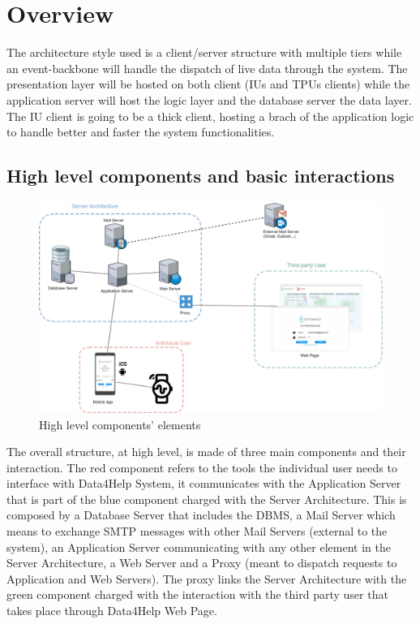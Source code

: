 \section{Overview}
The architecture style used is a client/server structure with multiple tiers while an event-backbone will handle the dispatch of live data through the system. The presentation layer will be hosted on both client (IUs and TPUs clients) while the application server will host the logic layer and the database server the data layer. The IU client is going to be a thick client, hosting a brach of the application logic to handle better and faster the system functionalities.
\subsection{High level components and basic interactions}
\begin{figure}[H]
\caption{High level components' elements}
\includegraphics[width = \textwidth]{sections/architecturalDesign/overview_1.jpg}
\end{figure}

The overall structure, at high level, is made of three main components and their interaction. 
The red component refers to the tools the individual user needs to interface with Data4Help System, it communicates with the Application Server that is part of the blue component charged with the Server Architecture. This is composed by a Database Server that includes the DBMS, a Mail Server which means to exchange SMTP messages with other Mail Servers (external to the system), an Application Server communicating with any other element in the Server Architecture, a Web Server and a Proxy (meant to dispatch requests to Application and Web Servers). 
The proxy links the Server Architecture with the green component charged with the interaction with the third party user that takes place through Data4Help Web Page. 

